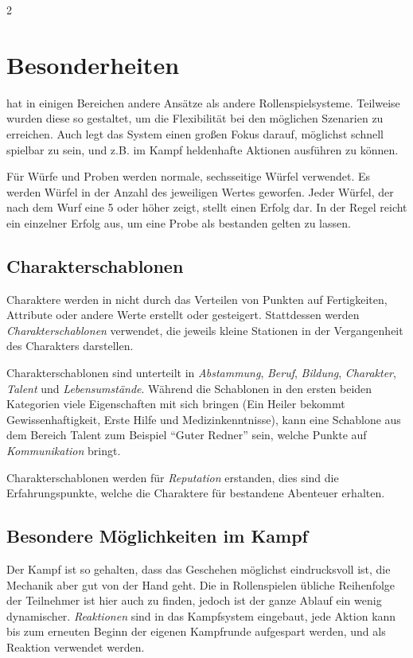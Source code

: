 \begin{multicols}{2}
\section{Besonderheiten}

 hat in einigen Bereichen andere Ansätze als andere Rollenspielsysteme. Teilweise wurden diese so gestaltet, um die Flexibilität bei den möglichen Szenarien zu erreichen. Auch legt das System einen großen Fokus darauf, möglichst schnell spielbar zu sein, und z.B. im Kampf heldenhafte Aktionen ausführen zu können.

Für Würfe und Proben werden normale, sechsseitige Würfel verwendet. Es werden Würfel in der Anzahl des jeweiligen Wertes geworfen. Jeder Würfel, der nach dem Wurf eine 5 oder höher zeigt, stellt einen Erfolg dar. In der Regel reicht ein einzelner Erfolg aus, um eine Probe als bestanden gelten zu lassen.

\subsection{Charakterschablonen}

Charaktere werden in  nicht durch das Verteilen von Punkten auf Fertigkeiten, Attribute oder andere Werte erstellt oder gesteigert. Stattdessen werden \textit{Charakterschablonen} verwendet, die jeweils kleine Stationen in der Vergangenheit des Charakters darstellen.

Charakterschablonen sind unterteilt in \textit{Abstammung}, \textit{Beruf}, \textit{Bildung}, \textit{Charakter}, \textit{Talent} und \textit{Lebensumstände}. Während die Schablonen in den ersten beiden Kategorien viele Eigenschaften mit sich bringen (Ein Heiler bekommt Gewissenhaftigkeit, Erste Hilfe und Medizinkenntnisse), kann eine Schablone aus dem Bereich Talent zum Beispiel ``Guter Redner'' sein, welche Punkte auf \textit{Kommunikation} bringt.

Charakterschablonen werden für \textit{Reputation} erstanden, dies sind die Erfahrungspunkte, welche die Charaktere für bestandene Abenteuer erhalten.

\subsection{Besondere Möglichkeiten im Kampf}

Der Kampf ist so gehalten, dass das Geschehen möglichst eindrucksvoll ist, die Mechanik aber gut von der Hand geht. Die in Rollenspielen übliche Reihenfolge der Teilnehmer ist hier auch zu finden, jedoch ist der ganze Ablauf ein wenig dynamischer. \textit{Reaktionen} sind in das Kampfsystem eingebaut, jede Aktion kann bis zum erneuten Beginn der eigenen Kampfrunde aufgespart werden, und als Reaktion verwendet werden.


\end{multicols}
